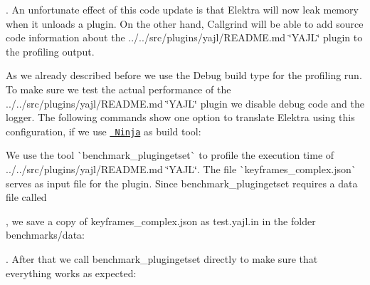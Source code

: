 . An unfortunate effect of this code update is that Elektra will now leak memory when it unloads a plugin. On the other hand, Callgrind will be able to add source code information about the ../../src/plugins/yajl/\+R\+E\+A\+D\+ME.md \char`\"{}\+Y\+A\+J\+L\char`\"{} plugin to the profiling output.

As we already described before we use the {\ttfamily Debug} build type for the profiling run. To make sure we test the actual performance of the ../../src/plugins/yajl/\+R\+E\+A\+D\+ME.md \char`\"{}\+Y\+A\+J\+L\char`\"{} plugin we disable debug code and the logger. The following commands show one option to translate Elektra using this configuration, if we use \href{https://ninja-build.org}{\texttt{ Ninja}} as build tool\+:


\begin{DoxyCode}{0}
\end{DoxyCode}


We use the tool \`{}benchmark\+\_\+plugingetset\`{} to profile the execution time of ../../src/plugins/yajl/\+R\+E\+A\+D\+ME.md \char`\"{}\+Y\+A\+J\+L\char`\"{}. The file \`{}keyframes\+\_\+complex.json\`{} serves as input file for the plugin. Since {\ttfamily benchmark\+\_\+plugingetset} requires a data file called


\begin{DoxyCode}{0}
\end{DoxyCode}


, we save a copy of {\ttfamily keyframes\+\_\+complex.\+json} as {\ttfamily test.\+yajl.\+in} in the folder {\ttfamily benchmarks/data}\+:


\begin{DoxyCode}{0}
\end{DoxyCode}


. After that we call {\ttfamily benchmark\+\_\+plugingetset} directly to make sure that everything works as expected\+:


\begin{DoxyCode}{0}
\end{DoxyCode}


